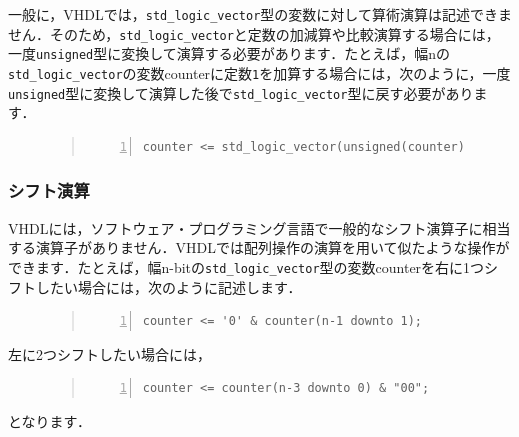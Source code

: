 \documentclass[a4paper,dvipdfmx]{jsarticle}
\begin{document}
一般に，VHDLでは，\verb|std_logic_vector|型の変数に対して算術演算は記述できません．そのため，\verb|std_logic_vector|と定数の加減算や比較演算する場合には，一度\verb|unsigned|型に変換して演算する必要があります．たとえば，幅nの\verb|std_logic_vector|の変数counterに定数\verb|1|を加算する場合には，次のように，一度\verb|unsigned|型に変換して演算した後で\verb|std_logic_vector|型に戻す必要があります．
\begin{figure}[H]
\begin{quote}
\begin{Verbatim}[frame=single, numbers=left, baselinestretch=0.8]
counter <= std_logic_vector(unsigned(counter) + 1);
\end{Verbatim}
\end{quote}
\end{figure}

\subsubsection{シフト演算}
VHDLには，ソフトウェア・プログラミング言語で一般的なシフト演算子に相当する演算子がありません．VHDLでは配列操作の演算を用いて似たような操作ができます．たとえば，幅n-bitの\verb|std_logic_vector|型の変数counterを右に1つシフトしたい場合には，次のように記述します．
\begin{figure}[H]
\begin{quote}
\begin{Verbatim}[frame=single, numbers=left, baselinestretch=0.8]
counter <= '0' & counter(n-1 downto 1);
\end{Verbatim}
\end{quote}
\end{figure}
左に2つシフトしたい場合には，
\begin{figure}[H]
\begin{quote}
\begin{Verbatim}[frame=single, numbers=left, baselinestretch=0.8]
counter <= counter(n-3 downto 0) & "00";
\end{Verbatim}
\end{quote}
\end{figure}
となります．
\end{document}
